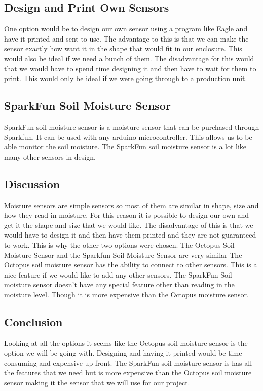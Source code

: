 \documentclass[onecolumn, draftclsnofoot,10pt, compsoc]{IEEEtran}
\begin{document}
		\subsection{Design and Print Own Sensors}
		One option would be to design our own sensor using a program like Eagle and
		have it printed and sent to use. The advantage to this is that we can make the
		sensor exactly how want it in the shape that would fit in our enclosure. This
		would also be ideal if we need a bunch of them. The disadvantage for this would
		that we would have to spend time designing it and then have to wait for them
		to print. This would only be ideal if we were going through to a production
		unit.
		\subsection{SparkFun Soil Moisture Sensor}
		SparkFun soil moisture sensor is a moisture sensor that can be purchased through
		Sparkfun. It can be used with any arduino microcontroller. This allows us to be able
		monitor the soil moisture. The SparkFun soil moisture sensor is a lot like
		many other sensors in design.
		\subsection{Discussion}
		Moisture sensors are simple sensors so most of them are similar in shape,
		size and how they read in moisture. For this reason it is possible to design
		our own and get it the shape and size that we would like. The disadvantage of this
		is that we would have to design it and then have them printed and they are
		not guaranteed to work. This is why the other two options were chosen. The
		Octopus Soil Moisture Sensor and the Sparkfun Soil Moisture Sensor are very similar
		The Octopus soil moisture sensor has the ability to connect to other sensors.
		This is a nice feature if we would like to add any other sensors. The SparkFun
		Soil moisture sensor doesn't have any special feature other than reading in
		the moisture level. Though it is more expensive than the Octopus moisture sensor.
		\subsection{Conclusion}
		Looking at all the options it seems like the Octopus soil moisture sensor is
		the option we will be going with. Designing and having it printed would be
		time consuming and expensive up front. The SparkFun soil moisture sensor is
		has all the features that we need but is more expensive than the Octopus soil
		moisture sensor making it the sensor that we will use for our project.
\end{document}
